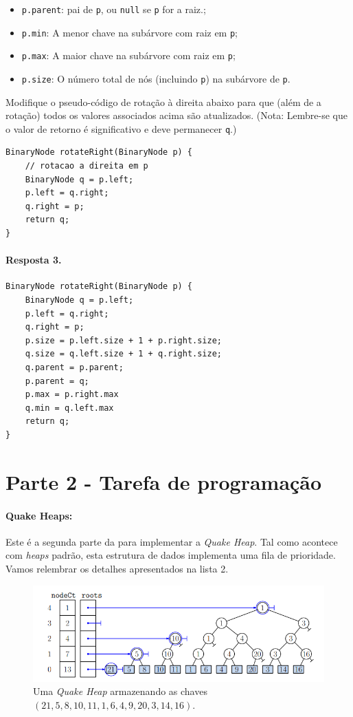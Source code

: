 \documentclass{article}
\begin{document}
\begin{itemize}
    \item \texttt{p.parent}: pai de \texttt{p}, ou \texttt{null} se \texttt{p} for a raiz.;
    \item \texttt{p.min}: A menor chave na subárvore com raiz em \texttt{p};
    \item \texttt{p.max}: A maior chave na subárvore com raiz em \texttt{p};
    \item \texttt{p.size}: O número total de nós (incluindo \texttt{p}) na subárvore de \texttt{p}.
\end{itemize}

Modifique o pseudo-código de rotação à direita abaixo para que (além de
a rotação) todos os valores associados acima são atualizados. (Nota: Lembre-se que o
valor de retorno é significativo e deve permanecer \texttt{q}.)
\begin{lstlisting}
BinaryNode rotateRight(BinaryNode p) { 
    // rotacao a direita em p
    BinaryNode q = p.left;
    p.left = q.right;
    q.right = p;
    return q;
}
\end{lstlisting}

\paragraph{Resposta 3.}
\begin{lstlisting}
BinaryNode rotateRight(BinaryNode p) { 
    BinaryNode q = p.left;
    p.left = q.right;
    q.right = p;
    p.size = p.left.size + 1 + p.right.size;
    q.size = q.left.size + 1 + q.right.size;
    q.parent = p.parent;
    p.parent = q;
    p.max = p.right.max
    q.min = q.left.max
    return q;
}
\end{lstlisting}

\section*{Parte 2 - Tarefa de programação}

\paragraph{Quake Heaps:}

Este é a segunda parte da para implementar a \textit{Quake Heap}. Tal como acontece com \textit{heaps} padrão, esta estrutura de dados implementa uma fila de prioridade. Vamos relembrar os detalhes apresentados na lista 2.


\begin{figure}[!h]
    \centering
    \includegraphics[width = 0.8\linewidth]{figures/fig1.png}
    \caption{Uma \textit{Quake Heap} armazenando as chaves $(21, 5, 8, 10, 11, 1, 6, 4, 9, 20, 3, 14, 16)$.}
    \label{fig:fig1}
\end{figure}
\end{document}
